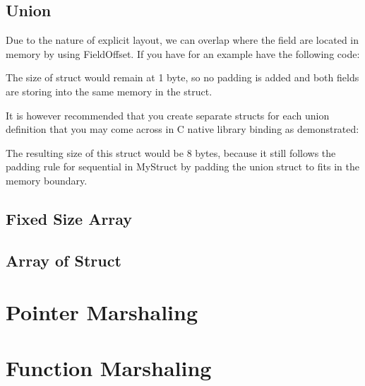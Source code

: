 \subsection{Union}
Due to the nature of explicit layout, we can overlap where the field are located in memory by using FieldOffset. If you have for an example have the following code:



The size of struct would remain at 1 byte, so no padding is added and both fields are storing into the same memory in the struct.

It is however recommended that you create separate structs for each union definition that you may come across in C native library binding as demonstrated:



The resulting size of this struct would be 8 bytes, because it still follows the padding rule for sequential in MyStruct by padding the union struct to fits in the memory boundary.

\subsection{Fixed Size Array}

\subsection{Array of Struct}

\section{Pointer Marshaling}

\section{Function Marshaling}

